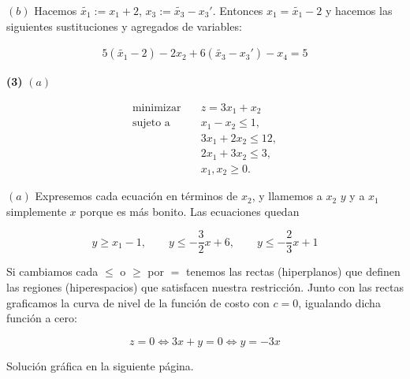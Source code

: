 \documentclass[12pt]{article}
\begin{document}
\pagebreak 

$(b)$ Hacemos $\widetilde{ x_1 } := x_1 + 2 $, $x_3 := \widetilde{ x_3 } - x_3'$.
Entonces $x_1 = \widetilde{ x_1 } - 2 $ y hacemos las siguientes sustituciones y
agregados de variables: 

\begin{align*}
    5(\widetilde{ x_1 } - 2) - 2x_2 + 6(\widetilde{ x_3 } - x_3' ) - x_4 = 5
\end{align*}

\begin{myframe}
    \textbf{(3)} $(a)$ 

\[
\begin{aligned}
\text{minimizar} \quad & z = 3x_1 + x_2 \\
\text{sujeto a} \quad
& x_1 - x_2 \leq 1, \\
& 3x_1 + 2x_2 \leq 12, \\
& 2x_1 + 3x_2 \leq 3, \\
& x_1, x_2 \geq 0.
\end{aligned}
\]




\end{myframe}

$(a)$ Expresemos cada ecuación en términos de $x_2$, y llamemos a $x_2$ $y$ y a
$x_1$ simplemente $x$ porque es más bonito. Las ecuaciones quedan  

\begin{equation*}
    y \geq x_1 - 1, \qquad
    y \leq -\frac{3}{2}x + 6, \qquad
    y \leq -\frac{2}{3}x + 1
\end{equation*}

Si cambiamos cada $\leq$ o $\geq$ por $=$ tenemos las rectas (hiperplanos) que
definen las regiones (hiperespacios) que satisfacen nuestra restricción. Junto
con las rectas graficamos la curva de nivel de la función de costo con $c = 0$,
igualando dicha función a cero:

\begin{equation*}
    z = 0 \iff  3x + y = 0 \iff y = -3x
\end{equation*}

Solución gráfica en la siguiente página.
\end{document}

